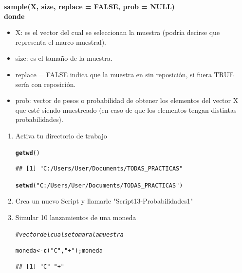 \documentclass[12pt,letterpaper]{article}\usepackage[]{graphicx}\usepackage[]{color}
\makeatletter
\newcommand{\hlstr}[1]{\textcolor[rgb]{0.192,0.494,0.8}{#1}}%
\newcommand{\hlcom}[1]{\textcolor[rgb]{0.678,0.584,0.686}{\textit{#1}}}%
\newcommand{\hlstd}[1]{\textcolor[rgb]{0.345,0.345,0.345}{#1}}%
\newcommand{\hlkwb}[1]{\textcolor[rgb]{0.69,0.353,0.396}{#1}}%
\newcommand{\hlkwd}[1]{\textcolor[rgb]{0.737,0.353,0.396}{\textbf{#1}}}%
\newenvironment{kframe}{%
 \def\at@end@of@kframe{}%
 \ifinner\ifhmode%
  \def\at@end@of@kframe{\end{minipage}}%
  \begin{minipage}{\columnwidth}%
 \fi\fi%
 \def\FrameCommand##1{\hskip\@totalleftmargin \hskip-\fboxsep
 \colorbox{shadecolor}{##1}\hskip-\fboxsep
     \hskip-\linewidth \hskip-\@totalleftmargin \hskip\columnwidth}%
 \MakeFramed {\advance\hsize-\width
   \@totalleftmargin\z@ \linewidth\hsize
   \@setminipage}}%
 {\par\unskip\endMakeFramed%
 \at@end@of@kframe}
\newenvironment{knitrout}{}{} %
\makeatother
\begin{document}
\textbf{ sample(X, size, replace = FALSE, prob = NULL)}\\
\textbf{donde}
\begin{itemize}
\item X: es el vector del cual se seleccionan la muestra (podr\'ia decirse que representa el marco muestral).
\item size: es el tama\~no de la muestra.
\item replace = FALSE indica que la muestra en sin reposici\'on, si fuera TRUE ser\'ia con reposici\'on.
\item prob: vector de pesos o probabilidad de obtener los elementos del vector X que est\'e siendo muestreado (en caso de que los elementos tengan distintas probabilidades). 
\end{itemize}

\begin{enumerate}
\item  Activa tu directorio de trabajo

\begin{knitrout}
\color{fgcolor}\begin{kframe}
\begin{alltt}
\hlkwd{getwd}\hlstd{()}
\end{alltt}
\begin{verbatim}
## [1] "C:/Users/User/Documents/TODAS_PRACTICAS"
\end{verbatim}
\begin{alltt}
\hlkwd{setwd}\hlstd{(}\hlstr{"C:/Users/User/Documents/TODAS_PRACTICAS"}\hlstd{)}
\end{alltt}
\end{kframe}
\end{knitrout}

\item  Crea un nuevo Script y llamarle "Script13-Probabilidades1"

\item Simular 10 lanzamientos de una moneda

\begin{knitrout}
\color{fgcolor}\begin{kframe}
\begin{alltt}
\hlcom{# vector del cual se tomara la muestra}

\hlstd{moneda} \hlkwb{<-} \hlkwd{c}\hlstd{(}\hlstr{"C"}\hlstd{,} \hlstr{"+"}\hlstd{); moneda}
\end{alltt}
\begin{verbatim}
## [1] "C" "+"
\end{verbatim}
\end{kframe}
\end{knitrout}


\end{enumerate}
\end{document}
